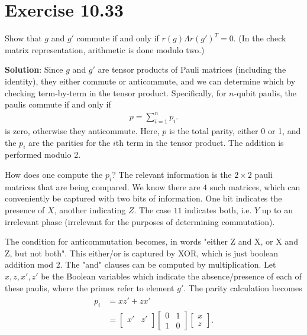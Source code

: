 \documentclass{book}
\begin{document}
\section*{Exercise 10.33}
    Show that $g$ and $g'$ commute if and only if $r(g) \Lambda r(g')^T = 0$. (In the check matrix representation, arithmetic is done modulo two.)
    
    \textbf{Solution}: Since $g$ and $g'$ are tensor products of Pauli matrices (including the identity), they either commute or anticommute, and we can determine which by checking term-by-term in the tensor product. Specifically, for $n$-qubit paulis, the paulis commute if and only if
    \begin{align}
        p = \sum_{i=1}^n p_i.
    \end{align}
    is zero, otherwise they anticommute. Here, $p$ is the total parity, either 0 or 1, and the $p_i$ are the parities for the $i$th term in the tensor product. The addition is performed modulo 2.

    How does one compute the $p_i$? The relevant information is the $2\times 2$ pauli matrices that are being compared. We know there are $4$ such matrices, which can conveniently be captured with two bits of information. One bit indicates the presence of $X$, another indicating $Z$. The case $11$ indicates both, i.e. $Y$ up to an irrelevant phase (irrelevant for the purposes of determining commutation). 
    
    The condition for anticommutation becomes, in words "either Z and X, or X and Z, but not both". This either/or is captured by XOR, which is just boolean addition mod 2. The "and" clauses can be computed by multiplication. Let $x, z, x', z'$ be the Boolean variables which indicate the absence/presence of each of these paulis, where the primes refer to element $g'$. The parity calculation becomes
    \begin{align}
    \begin{aligned}
        p_i &= x z' + z x' \\[1.5ex]
        &= \begin{bmatrix}
            x' & z' \\
        \end{bmatrix} \begin{bmatrix}
            0 & 1 \\
            1 & 0
        \end{bmatrix} \begin{bmatrix}
            x \\
            z
        \end{bmatrix}.
    \end{aligned}
    \end{align}
    
\end{document}
